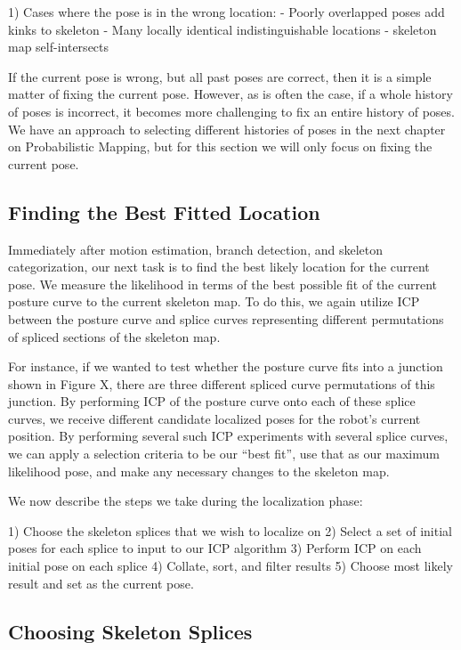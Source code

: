 1) Cases where the pose is in the wrong location:
 - Poorly overlapped poses add kinks to skeleton
 - Many locally identical indistinguishable locations
 - skeleton map self-intersects

If the current pose is wrong, but all past poses are correct, then it is a simple matter of fixing the current pose. However, as is often the case, if a whole history of poses is incorrect, it becomes more challenging to fix an entire history of poses. We have an approach to selecting different histories of poses in the next chapter on Probabilistic Mapping, but for this section we will only focus on fixing the current pose.

\subsection{Finding the Best Fitted Location}
\label{findingthebestfittedlocation}

Immediately after motion estimation, branch detection, and skeleton categorization, our next task is to find the best likely location for the current pose. We measure the likelihood in terms of the best possible fit of the current posture curve to the current skeleton map. To do this, we again utilize ICP between the posture curve and splice curves representing different permutations of spliced sections of the skeleton map.

For instance, if we wanted to test whether the posture curve fits into a junction shown in Figure X, there are three different spliced curve permutations of this junction. By performing ICP of the posture curve onto each of these splice curves, we receive different candidate localized poses for the robot's current position. By performing several such ICP experiments with several splice curves, we can apply a selection criteria to be our “best fit”, use that as our maximum likelihood pose, and make any necessary changes to the skeleton map.

We now describe the steps we take during the localization phase:

1) Choose the skeleton splices that we wish to localize on
2) Select a set of initial poses for each splice to input to our ICP algorithm
3) Perform ICP on each initial pose on each splice
4) Collate, sort, and filter results
5) Choose most likely result and set as the current pose.

\subsection{Choosing Skeleton Splices}
\label{choosingskeletonsplices}

